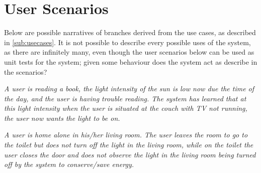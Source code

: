 \section{User Scenarios}\label{sub:userscenarios}

Below are possible narratives of branches derived from the use cases, as described in \cref{sub:usecases}. It is not possible to describe every possible uses of the system, as there are infinitely many, even though the user scenarios below can be used as unit tests for the system; given some behaviour does the system act as describe in the scenarios?

\textit{A user is reading a book, the light intensity of the sun is low now due the time of the day, and the user is having trouble reading. The system has learned that at this light intensity when the user is situated at the couch with TV not running, the user now wants the light to be on.}

\textit{A user is home alone in his/her living room. The user leaves the room to go to the toilet but does not turn off the light in the living room, while on the toilet the user closes the door and does not observe the light in the living room being turned off by the system to conserve/save energy.}

